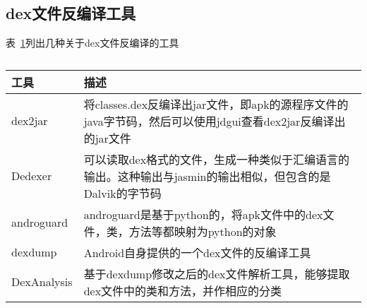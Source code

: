 \subsection{dex文件反编译工具}
表~\ref{fig:dextools}列出几种关于dex文件反编译的工具
\begin{table}[H]
\caption{\label{fig:dextools}}
\begin{tabular}{|p{2cm}|p{8cm}|}
\hline
工具 & 描述\\
\hline
dex2jar & 将classes.dex反编译出jar文件，即apk的源程序文件的java字节码，然后可以使用jdgui查看dex2jar反编译出的jar文件\\
\hline
Dedexer & 可以读取dex格式的文件，生成一种类似于汇编语言的输出。这种输出与jasmin的输出相似，但包含的是Dalvik的字节码\\
\hline
androguard & androguard是基于python的，将apk文件中的dex文件，类，方法等都映射为python的对象\\\hline
dexdump & Android自身提供的一个dex文件的反编译工具\\
\hline
DexAnalysis & 基于dexdump修改之后的dex文件解析工具，能够提取dex文件中的类和方法，并作相应的分类\\
\hline
\end{tabular}
\end{table}


